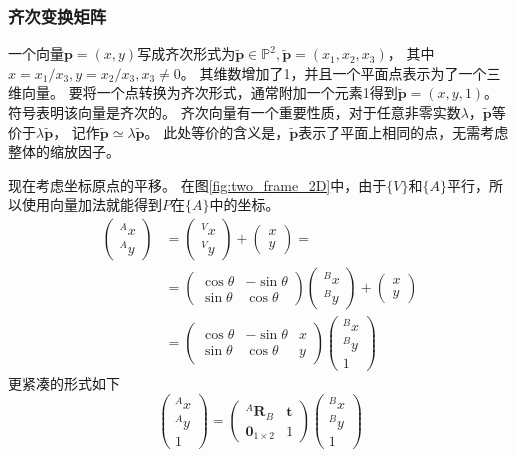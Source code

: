 \documentclass[UTF8,a4paper,10pt]{ctexart}
\begin{document}
\subsubsection{齐次变换矩阵}

一个向量$\mathbf{p}=(x,y)$写成齐次形式为$\tilde{\mathbf{p}}\in\mathbb{P}^2,\tilde{\mathbf{p}}=(x_1,x_2,x_3)$，
其中$x=x_1/x_3, y=x_2/x_3, x_3\neq0$。
其维数增加了1，并且一个平面点表示为了一个三维向量。
要将一个点转换为齐次形式，通常附加一个元素1得到$\tilde{\mathbf{p}}=(x,y,1)$。符号$\tilde{}$表明该向量是齐次的。
齐次向量有一个重要性质，对于任意非零实数$\lambda$，$\tilde{\mathbf{p}}$等价于$\lambda\tilde{\mathbf{p}}$，
记作$\tilde{\mathbf{p}}\simeq\lambda\tilde{\mathbf{p}}$。
此处等价的含义是，$\tilde{\mathbf{p}}$表示了平面上相同的点，无需考虑整体的缩放因子。

现在考虑坐标原点的平移。
在图\ref{fig:two_frame_2D}中，由于$\{V\}$和$\{A\}$平行，所以使用向量加法就能得到$P$在$\{A\}$中的坐标。
\begin{align*}
  \begin{pmatrix}{}^Ax\\{}^Ay\end{pmatrix}
  &=\begin{pmatrix}{}^Vx\\{}^Vy\end{pmatrix}+\begin{pmatrix}x\\y\end{pmatrix}=\\
  &=\begin{pmatrix}\cos\theta  & -\sin\theta\\\sin\theta & \cos\theta\end{pmatrix}
    \begin{pmatrix}{}^Bx\\{}^By\end{pmatrix}+\begin{pmatrix}x\\y\end{pmatrix}\\
  &=\begin{pmatrix}\cos\theta  & -\sin\theta & x\\\sin\theta & \cos\theta & y\end{pmatrix}
    \begin{pmatrix}{}^Bx\\{}^By\\1\end{pmatrix}
\end{align*}
更紧凑的形式如下
\begin{equation}
  \begin{pmatrix}{}^Ax\\{}^Ay\\1\end{pmatrix}=
  \begin{pmatrix}{}^A\mathbf{R}_B & \mathbf{t}\\\mathbf{0}_{1\times2}&1\end{pmatrix}
  \begin{pmatrix}{}^Bx\\{}^By\\1\end{pmatrix}
\end{equation}
\end{document}
